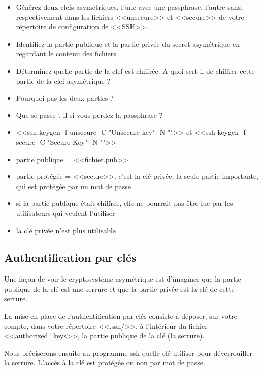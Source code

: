 \documentclass[11pt]{article}
\begin{document}
\begin{itemize}
 \item Générez deux clefs asymétriques, l’une avec une passphrase, l’autre sans, respectivement dans les fichiers <<unsecure>> et 
<<secure>> de votre répertoire de configuration de <<SSH>>.
 \item Identifiez la partie publique et la partie privée du secret asymétrique en regardant le contenu des fichiers.
 \item Déterminez quelle partie de la clef est chiffrée. A quoi sert-il de chiffrer cette partie de la clef asymétrique ?
 \item Pourquoi pas les deux parties ?
 \item Que se passe-t-il si vous perdez la passphrase ?
\end{itemize}

\begin{solution}
\begin{itemize}
 \item <<ssh-keygen -f unsecure -C "Unsecure key" -N "">> et <<ssh-keygen -f secure -C "Secure Key" -N "">>
 \item partie publique = <<fichier.pub>> 
 \item partie protégée = <<secure>>, c'est la clé privée, la seule partie importante, qui est protégée par un mot de passe
 \item si la partie publique était chiffrée, elle ne pourrait pas être lue par les utilisateurs qui veulent l'utiliser
 \item la clé privée n'est plus utilisable
\end{itemize}
\end{solution}

\subsection{Authentification par clés}

Une façon de voir le cryptosystème asymétrique est d'imaginer que la partie publique de la clé est une serrure et que la
partie privée est la clé de cette serrure.

La mise en place de l'authentification par clés consiste à déposer, sur votre compte, dans votre répertoire <<.ssh/>>, à 
l’intérieur du fichier <<authorized\_keys>>, la partie publique de la clé (la serrure).

Nous préciserons ensuite au programme ssh quelle clé utiliser pour déverrouiller la serrure. L'accès à la clé est protégée
ou non par mot de passe.
\end{document}
